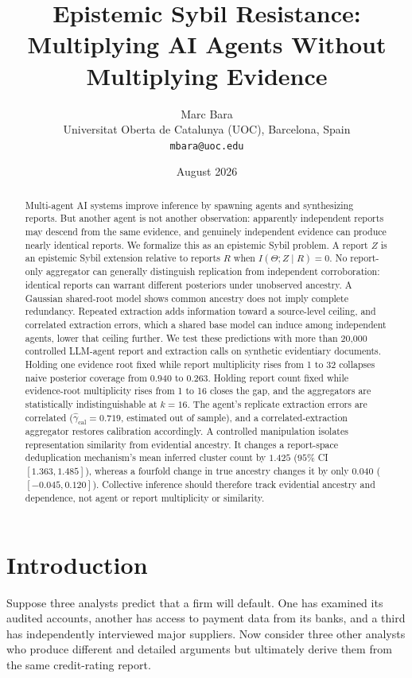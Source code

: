 \documentclass[11pt]{article}
\title{Epistemic Sybil Resistance:\\Multiplying AI Agents Without Multiplying Evidence}
\author{Marc Bara\\Universitat Oberta de Catalunya (UOC), Barcelona, Spain\\\texttt{mbara@uoc.edu}}
\date{August 2026}
\theoremstyle{definition}
\begin{document}
\maketitle

\begin{abstract}
Multi-agent AI systems improve inference by spawning agents and synthesizing reports. But another agent is not another observation: apparently independent reports may descend from the same evidence, and genuinely independent evidence can produce nearly identical reports. We formalize this as an epistemic Sybil problem. A report $Z$ is an epistemic Sybil extension relative to reports $R$ when $I(\Theta;Z\mid R)=0$. No report-only aggregator can generally distinguish replication from independent corroboration: identical reports can warrant different posteriors under unobserved ancestry. A Gaussian shared-root model shows common ancestry does not imply complete redundancy. Repeated extraction adds information toward a source-level ceiling, and correlated extraction errors, which a shared base model can induce among independent agents, lower that ceiling further. We test these predictions with more than 20,000 controlled LLM-agent report and extraction calls on synthetic evidentiary documents. Holding one evidence root fixed while report multiplicity rises from 1 to 32 collapses naive posterior coverage from 0.940 to 0.263. Holding report count fixed while evidence-root multiplicity rises from 1 to 16 closes the gap, and the aggregators are statistically indistinguishable at $k=16$. The agent's replicate extraction errors are correlated ($\hat\gamma_{\mathrm{cal}}=0.719$, estimated out of sample), and a correlated-extraction aggregator restores calibration accordingly. A controlled manipulation isolates representation similarity from evidential ancestry. It changes a report-space deduplication mechanism's mean inferred cluster count by $1.425$ ($95\%$ CI $[1.363,1.485]$), whereas a fourfold change in true ancestry changes it by only $0.040$ ($[-0.045,0.120]$). Collective inference should therefore track evidential ancestry and dependence, not agent or report multiplicity or similarity.
\end{abstract}

\section{Introduction}

Suppose three analysts predict that a firm will default. One has examined its audited accounts, another has access to payment data from its banks, and a third has independently interviewed major suppliers. Now consider three other analysts who produce different and detailed arguments but ultimately derive them from the same credit-rating report.
\end{document}
